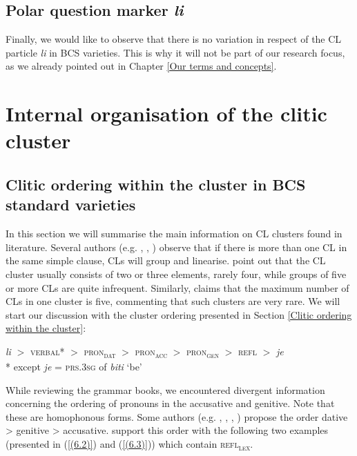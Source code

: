 \subsection{Polar question marker \textit{li}}

Finally, we would like to observe that there is no variation in respect of the CL particle \textit{li} in BCS varieties. This is why it will not be part of our research focus, as we already pointed out in Chapter \ref{Our terms and concepts}.

\section{Internal organisation of the clitic cluster}
\label{Internal organisation of the clitic cluster:7}
\subsection{Clitic ordering within the cluster in BCS standard varieties}
\label{Clitic ordering within the cluster in BCS standard varieties}
In this section we will summarise the main information on CL clusters found in literature. Several authors (e.g. \citealt[471]{JHP00}, \citealt[284, 289]{Popovic04}, \citealt[451]{PiperKlajn14}) observe that if there is more than one CL in the same simple clause, CLs will group and linearise. \citet[451f]{PiperKlajn14} point out that the CL cluster usually consists of two or three elements, rarely four, while groups of five or more CLs are quite infrequent. Similarly, \citet[558]{Ridjanovic12} claims that the maximum number of CLs in one cluster is five, commenting that such clusters are very rare. We will start our discussion with the cluster ordering presented in Section \ref{Clitic ordering within the cluster}:

\begin{exe}\sn
\textit{li} ${}>{}$ \textsc{verbal}* ${}>{}$ \textsc{pron\textsubscript{dat}} ${}>{}$ \textsc{pron\textsubscript{acc}} ${}>{}$ \textsc{pron\textsubscript{gen}} ${}>{}$ \textsc{refl} ${}>{}$ \textit{je} \\
* except \textit{je} = \textsc{prs.3sg} of \textit{biti} `be'
\end{exe}

While reviewing the grammar books, we encountered divergent information concerning the ordering of pronouns in the accusative and genitive. Note that these are homophonous forms. Some authors (e.g. \citealt[246]{TezakBabic96}, \citealt[596]{Baric97}, \citealt[472]{JHP00}, \citealt[659]{MrazovicVukadinovic09}) propose the order dative > genitive > accusative. \citet[596f]{Baric97} support this order with the following two examples (presented in (\ref{(6.2)}) and (\ref{(6.3)})) which contain \textsc{refl\textsubscript{lex}}.

